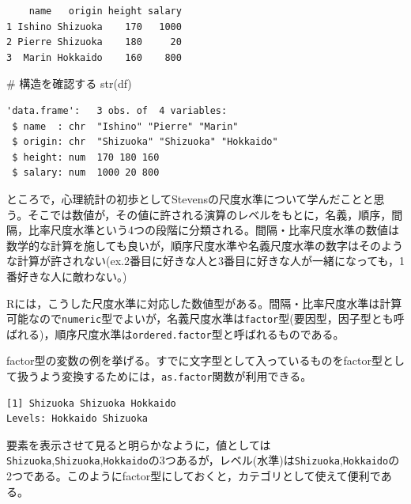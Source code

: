 \documentclass[
  a4paper,
]{ltjsbook}
\newenvironment{Shaded}{\begin{snugshade}}{\end{snugshade}}
\newcommand{\CommentTok}[1]{\textcolor[rgb]{0.37,0.37,0.37}{#1}}
\newcommand{\FunctionTok}[1]{\textcolor[rgb]{0.28,0.35,0.67}{#1}}
\newcommand{\NormalTok}[1]{\textcolor[rgb]{0.00,0.23,0.31}{#1}}
\newcommand{\OtherTok}[1]{\textcolor[rgb]{0.00,0.23,0.31}{#1}}
\newcommand{\SpecialCharTok}[1]{\textcolor[rgb]{0.37,0.37,0.37}{#1}}
\begin{document}
\begin{verbatim}
    name   origin height salary
1 Ishino Shizuoka    170   1000
2 Pierre Shizuoka    180     20
3  Marin Hokkaido    160    800
\end{verbatim}

\begin{Shaded}
\begin{Highlighting}[]
\CommentTok{\# 構造を確認する}
\FunctionTok{str}\NormalTok{(df)}
\end{Highlighting}
\end{Shaded}

\begin{verbatim}
'data.frame':   3 obs. of  4 variables:
 $ name  : chr  "Ishino" "Pierre" "Marin"
 $ origin: chr  "Shizuoka" "Shizuoka" "Hokkaido"
 $ height: num  170 180 160
 $ salary: num  1000 20 800
\end{verbatim}

ところで，心理統計の初歩としてStevensの尺度水準\autocite{stevens1946}について学んだことと思う。そこでは数値が，その値に許される演算のレベルをもとに，名義，順序，間隔，比率尺度水準という4つの段階に分類される。間隔・比率尺度水準の数値は数学的な計算を施しても良いが，順序尺度水準や名義尺度水準の数字はそのような計算が許されない(ex.2番目に好きな人と3番目に好きな人が一緒になっても，1番好きな人に敵わない。)

Rには，こうした尺度水準に対応した数値型がある。間隔・比率尺度水準は計算可能なので\texttt{numeric}型でよいが，名義尺度水準は\texttt{factor}型(要因型，因子型とも呼ばれる)，順序尺度水準は\texttt{ordered.factor}型と呼ばれるものである。

factor型の変数の例を挙げる。すでに文字型として入っているものをfactor型として扱うよう変換するためには，\texttt{as.factor}関数が利用できる。

\begin{Shaded}
\end{Shaded}

\begin{verbatim}
[1] Shizuoka Shizuoka Hokkaido
Levels: Hokkaido Shizuoka
\end{verbatim}

要素を表示させて見ると明らかなように，値としては\texttt{Shizuoka},\texttt{Shizuoka},\texttt{Hokkaido}の3つあるが，レベル(水準)は\texttt{Shizuoka},\texttt{Hokkaido}の2つである。このようにfactor型にしておくと，カテゴリとして使えて便利である。
\end{document}
